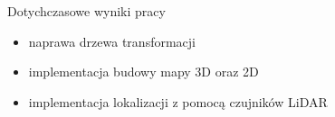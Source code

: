 \begin{frame}
{Dotychczasowe wyniki pracy}
	\begin{itemize}
		\item naprawa drzewa transformacji
		\item implementacja budowy mapy 3D oraz 2D
		\item implementacja lokalizacji z pomocą czujników LiDAR
	\end{itemize}
\end{frame}
